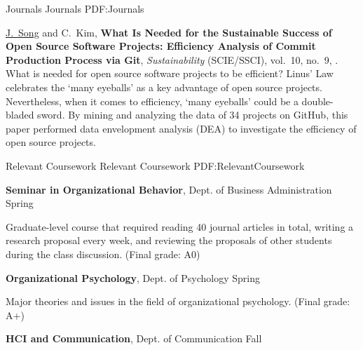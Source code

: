 \documentclass[letterpaper,MMMyyyy,nonstopmode]{template}
\begin{document}
\begin{Body}
\endgroup

\BigGap
\SubSection
{Journals}
{Journals}
{PDF:Journals}

\begingroup
\renewcommand{\MaxNumberedItem}{[88]}

\BigGap
\NumberedItem{[5]}
  \href{https://doi.org/10.3390/su10093001}
  \underline{J.~Song} and C.~Kim,
  \textbf{What Is Needed for the Sustainable Success of Open Source Software Projects: Efficiency Analysis of Commit Production Process via Git},
  \textit{Sustainability} (SCIE/SSCI),
  vol.~10,
  no.~9,
  .
  \vspace{2mm}\newline
  {\small{
    What is needed for open source software projects to be efficient? Linus' Law celebrates the `many eyeballs' as a key advantage of open source projects. 
    Nevertheless, when it comes to efficiency, `many eyeballs' could be a double-bladed sword. By mining and analyzing the data of 34 projects on GitHub, this paper performed data envelopment analysis (DEA) to investigate the efficiency of open source projects.
  }}

\endgroup



\BigGap
\Section
{Relevant Coursework}
{Relevant Coursework}
{PDF:RelevantCoursework}

\Entry
  \textbf{Seminar in Organizational Behavior},
  Dept. of Business Administration
  \hfill
   Spring

  \begin{Detail}
  \SubBulletItem
    Graduate-level course that required reading 40 journal articles in total, writing a research proposal every week, and reviewing the proposals of other students during the class discussion. (Final grade: A0)
  \end{Detail}

\BigGap
\Entry
  \textbf{Organizational Psychology},
  Dept. of Psychology
  \hfill
   Spring

  \begin{Detail}
  \SubBulletItem
    Major theories and issues in the field of organizational psychology. (Final grade: A+)
  \end{Detail}

\BigGap
\Entry
  \textbf{HCI and Communication},
  Dept. of Communication
  \hfill
   Fall


\end{Body}
\end{document}
